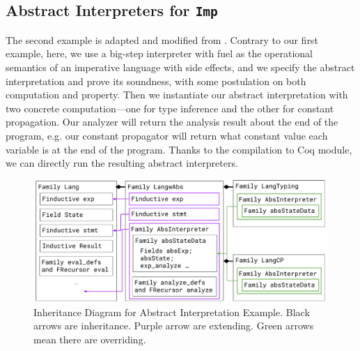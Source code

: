 \subsection{Abstract Interpreters for \texttt{Imp}}
The second example is adapted and modified from \citet{zm2017}.
Contrary to our first example, here, we use a big-step interpreter with fuel
as the operational semantics of an imperative language with
side effects, and we specify the abstract interpretation and prove its
soundness, with some postulation on both computation and property. Then we instantiate our abstract interpretation with two concrete computation---one for type inference and the other for constant propagation. Our analyzer will return the analysis result about the end of the program, e.g. our constant propagator will return what constant value each variable is at the end of the program. Thanks to the compilation to Coq module, we can directly run the resulting
abstract interpreters.



\begin{figure}[!htb]
  \includegraphics[width=\columnwidth]{coqexmaple/Family-Lang-Imp3.pdf}
  \caption{Inheritance Diagram for Abstract Interpretation Example. Black arrows are inheritance. Purple arrow are extending. Green arrows mean there are overriding.}\label{fig:abstract-interpretation-example}
\end{figure}

